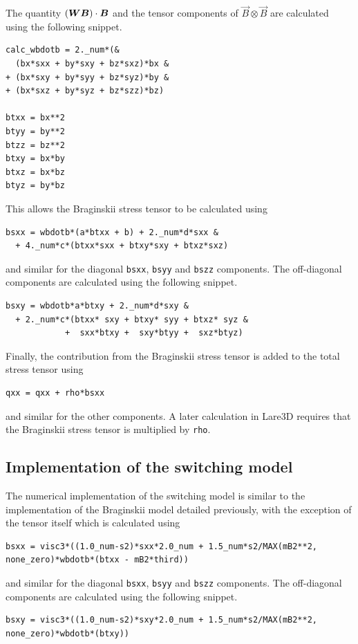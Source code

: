The quantity $({\bm W} {\bm B}) \cdot {\bm B}$ and the tensor components of $\vec{B} \otimes \vec{B}$ are calculated using the following snippet.
\begin{verbatim}
calc_wbdotb = 2._num*(&
  (bx*sxx + by*sxy + bz*sxz)*bx &
+ (bx*sxy + by*syy + bz*syz)*by &
+ (bx*sxz + by*syz + bz*szz)*bz)

btxx = bx**2
btyy = by**2
btzz = bz**2
btxy = bx*by
btxz = bx*bz
btyz = by*bz
\end{verbatim}

This allows the Braginskii stress tensor to be calculated using
\begin{verbatim}
bsxx = wbdotb*(a*btxx + b) + 2._num*d*sxx &
  + 4._num*c*(btxx*sxx + btxy*sxy + btxz*sxz)
\end{verbatim}
and similar for the diagonal \verb|bsxx|, \verb|bsyy| and \verb|bszz| components. The off-diagonal components are calculated using the following snippet.
\begin{verbatim}
bsxy = wbdotb*a*btxy + 2._num*d*sxy &
  + 2._num*c*(btxx* sxy + btxy* syy + btxz* syz &
            +  sxx*btxy +  sxy*btyy +  sxz*btyz)
\end{verbatim}

Finally, the contribution from the Braginskii stress tensor is added to the total stress tensor using 
\begin{verbatim}
qxx = qxx + rho*bsxx
\end{verbatim}
and similar for the other components. A later calculation in Lare3D requires that the Braginskii stress tensor is multiplied by \verb|rho|.

\subsection{Implementation of the switching model}

The numerical implementation of the switching model is similar to the implementation of the Braginskii model detailed previously, with the exception of the tensor itself which is calculated using
\begin{verbatim}
bsxx = visc3*((1.0_num-s2)*sxx*2.0_num + 1.5_num*s2/MAX(mB2**2, none_zero)*wbdotb*(btxx - mB2*third))
\end{verbatim}
and similar for the diagonal \verb|bsxx|, \verb|bsyy| and \verb|bszz| components. The off-diagonal components are calculated using the following snippet.
\begin{verbatim}
bsxy = visc3*((1.0_num-s2)*sxy*2.0_num + 1.5_num*s2/MAX(mB2**2, none_zero)*wbdotb*(btxy))
\end{verbatim}

